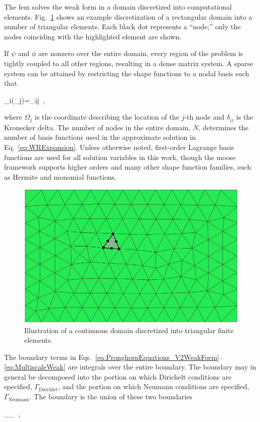 The \gls{fem} solves the weak form in a domain discretized into computational elements. Fig.\ \ref{fig:fe_mesh} shows an example discretization of a rectangular domain into a number of triangular elements. Each black dot represents a ``node;'' only the nodes coinciding with the highlighted element are shown.

If \(\psi\) and \(\phi\) are nonzero over the entire domain, every region of the problem is tightly coupled to all other regions, resulting in a dense matrix system. A sparse system can be attained by restricting the shape functions to a nodal basis such that

\beq
\label{eq:Nodal}
\phi_i(\Omega_j)=\delta_{ij}\ ,
\eeq

\noindent where \(\Omega_j\) is the coordinate describing the location of the \(j\)-th node and \(\delta_{ij}\) is the Kronecker delta. The number of nodes in the entire domain, \(N\), determines the number of basis functions used in the approximate solution in Eq.\ \eqref{eq:WRExpansion}. Unless otherwise noted, first-order Lagrange basis functions are used for all solution variables in this work, though the \gls{moose} framework supports higher orders and many other shape function families, such as Hermite and monomial functions.

\begin{figure}[!h]
\centering
\includegraphics[width=0.45\linewidth]{figs/fe_mesh.png}
\caption{Illustration of a continuous domain discretized into triangular finite elements.}
\label{fig:fe_mesh}
\end{figure}

The boundary terms in Eqs.\ \eqref{eq:PronghornEquations_V2WeakForm}--\eqref{eq:MultiscaleWeak} are integrals over the entire boundary. The boundary may in general be decomposed into the portion on which Dirichelt conditions are specified, \(\Gamma_\text{Dirichlet}\), and the portion on which Neumann conditions are specified, \(\Gamma_\text{Neumann}\). The boundary is the union of these two boundaries

\beq
\Gamma\equiv\Gamma_\cup\Gamma_\ ,
\eeq

